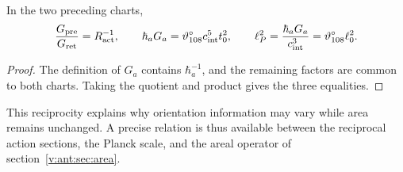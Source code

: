 \begin{proposition}
In the two preceding charts,
\[
\frac{G_{\rm pre}}{G_{\rm ret}}=R_{\rm act}^{-1},\qquad
\hbar_aG_a=\vartheta^\circ_{108}c_{\rm int}^5t_0^2,
\qquad
\ell_P^2=\frac{\hbar_aG_a}{c_{\rm int}^3}
=\vartheta^\circ_{108}\ell_0^2.
\]
\end{proposition}
\begin{proof}
The definition of $G_a$ contains $\hbar_a^{-1}$, and the remaining factors
are common to both charts. Taking the quotient and product gives
the three equalities.
\end{proof}
This reciprocity explains why orientation information may
vary while area remains unchanged. A precise relation is thus available
between the reciprocal action sections, the Planck scale, and the areal operator
of section~\ref{v:ant:sec:area}.
